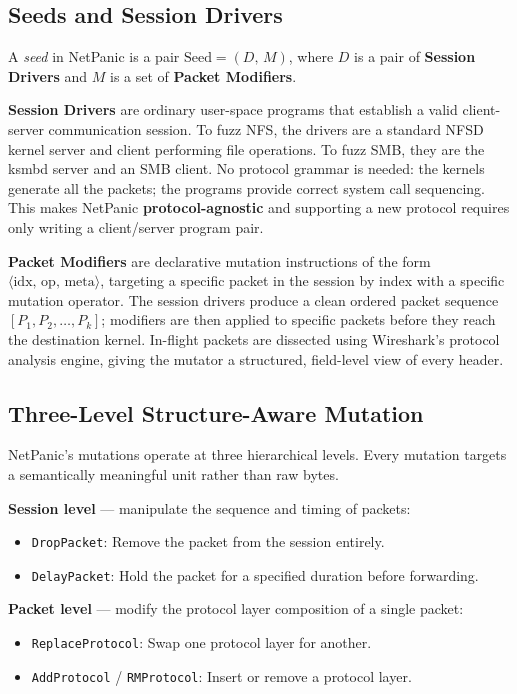\documentclass[10pt]{article}
\begin{document}
\subsection{Seeds and Session Drivers}

A \emph{seed} in NetPanic is a pair $\text{Seed} = (D,\, M)$, where $D$ is a pair of \textbf{Session Drivers} and $M$ is a set of \textbf{Packet Modifiers}.

\textbf{Session Drivers} are ordinary user-space programs that establish a valid client-server communication session. To fuzz NFS, the drivers are a standard NFSD kernel server and client performing file operations. To fuzz SMB, they are the ksmbd server and an SMB client. No protocol grammar is needed: the kernels generate all the packets; the programs provide correct system call sequencing. This makes NetPanic \textbf{protocol-agnostic} and supporting a new protocol requires only writing a client/server program pair.

\textbf{Packet Modifiers} are declarative mutation instructions of the form $\langle\text{idx},\, \text{op},\, \text{meta}\rangle$, targeting a specific packet in the session by index with a specific mutation operator. The session drivers produce a clean ordered packet sequence $[P_1, P_2, \ldots, P_k]$; modifiers are then applied to specific packets before they reach the destination kernel. In-flight packets are dissected using Wireshark's protocol analysis engine, giving the mutator a structured, field-level view of every header.

\subsection{Three-Level Structure-Aware Mutation}

NetPanic's mutations operate at three hierarchical levels. Every mutation targets a semantically meaningful unit rather than raw bytes.

\textbf{Session level} --- manipulate the sequence and timing of packets:
\begin{itemize}
  \item \texttt{DropPacket}: Remove the packet from the session entirely.
  \item \texttt{DelayPacket}: Hold the packet for a specified duration before forwarding.
\end{itemize}

\textbf{Packet level} --- modify the protocol layer composition of a single packet:
\begin{itemize}
  \item \texttt{ReplaceProtocol}: Swap one protocol layer for another.
  \item \texttt{AddProtocol} / \texttt{RMProtocol}: Insert or remove a protocol layer.
\end{itemize}
\end{document}
